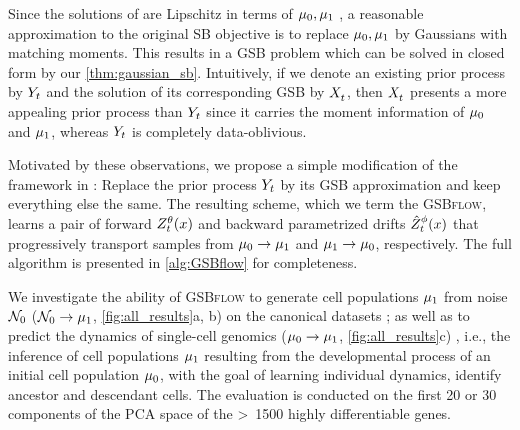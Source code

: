 Since the solutions of  are Lipschitz in terms of $\mu_0,\mu_1$ \citep{carlier2022lipschitz}, a reasonable approximation to the original \acrshort{SB} objective is to replace $\mu_0,\mu_1$ by Gaussians with matching moments. This results in a \acrshort{GSB} problem which can be solved in closed form by our \cref{thm:gaussian_sb}. Intuitively, if we denote an existing prior process by $Y_{ t }$ and the solution of its corresponding \acrshort{GSB} by $X^{}_{ t }$, then $X^{}_{ t }$ presents a more appealing prior process than $Y_{ t }$ since it carries the moment information of $\mu_0$ and $\mu_1$, whereas $Y_{ t }$ is completely data-oblivious.

Motivated by these observations, we propose a simple modification of the framework in \citet{chen2021likelihood}: Replace the prior process $Y_{ t }$ by its \acrshort{GSB} approximation and keep everything else the same. The resulting scheme, which we term the \textsc{GSBflow}, learns a pair of forward {\color{pink} $\SBf$} and backward parametrized drifts {\color{blue} $\SBb$} that progressively transport samples from $\mu_0 \rightarrow \mu_1$ and $\mu_1 \rightarrow \mu_0$, respectively. The full algorithm is presented in \cref{alg:GSBflow} for completeness.

 We investigate the ability of \textsc{GSBflow} to generate cell populations $\mu_1$ from noise $\mathcal{N}_0$ ($\mathcal{N}_0 \rightarrow \mu_1$, \cref{fig:all_results}a, b) on the canonical datasets \citep{moon2019visualizing, schiebinger2019optimal}; as well as to predict the dynamics of single-cell genomics ($\mu_0 \rightarrow \mu_1$, \cref{fig:all_results}c) \citep{moon2019visualizing}, i.e., the inference of cell populations $\mu_1$ resulting from the developmental process of an initial cell population $\mu_0$, with the goal of learning individual dynamics, identify ancestor and descendant cells. 
The evaluation is conducted on the first 20 or 30 components of the PCA space of the >~1500 highly differentiable genes.

